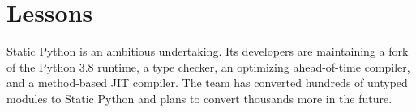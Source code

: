 \documentclass[english,cleveref,submission]{programming}
\newcommand{\SP}{Static Python}
\begin{document}
\section{Lessons}
\label{s:conclusion}


\SP{} is an ambitious undertaking.
Its developers are maintaining a fork of the Python 3.8 runtime,
a type checker,
an optimizing ahead-of-time compiler,
and a method-based JIT compiler.
The team has converted hundreds of untyped modules to \SP{}
and plans to convert thousands more in the future.
\end{document}
